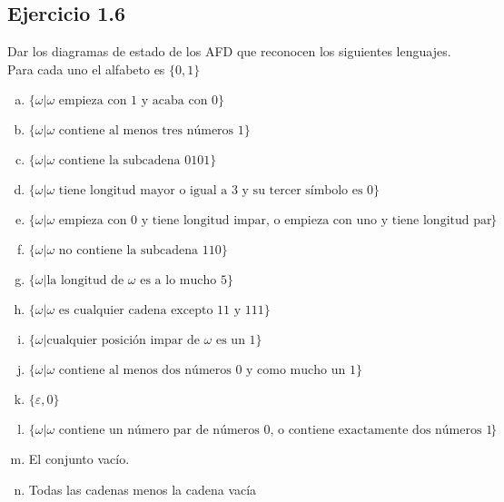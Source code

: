 \documentclass{article}
\begin{document}
\subsection*{Ejercicio 1.6}
Dar los diagramas de estado de los AFD que reconocen los siguientes lenguajes. Para cada uno el alfabeto es $\{0,1\}$
\begin{enumerate}[a.]
    \item $\{\omega|\omega\text{ empieza con 1 y acaba con 0\}}$
    
    
    \item $\{\omega|\omega\text{ contiene al menos tres números 1}\}$
    
    
    \item $\{\omega|\omega\text{ contiene la subcadena 0101}\}$
    
    
    \item $\{\omega|\omega\text{ tiene longitud mayor o igual a 3 y su tercer símbolo es 0}\}$
    
    
    \item $\{\omega|\omega\text{ empieza con 0 y tiene longitud impar, o empieza con uno y tiene longitud par}\}$
    
    
    \item $\{\omega|\omega\text{ no contiene la subcadena 110}\}$
    
    
    \item $\{\omega|\text{la longitud de }\omega\text{ es a lo mucho 5}\}$
    
    
    \item $\{\omega|\omega\text{ es cualquier cadena excepto 11 y 111}\}$
    
    
    \item $\{\omega|\text{cualquier posición impar de }\omega\text{ es un 1}\}$
    
    
    \item $\{\omega|\omega\text{ contiene al menos dos números 0 y como mucho un 1}\}$
    
    
    \item $\{\varepsilon,0\}$
    
    
    \item $\{\omega|\omega\text{ contiene un número par de números 0, o contiene exactamente dos números 1}\}$
    
    
    \item El conjunto vacío.
    
    
    \item Todas las cadenas menos la cadena vacía
    
\end{enumerate}
\end{document}
